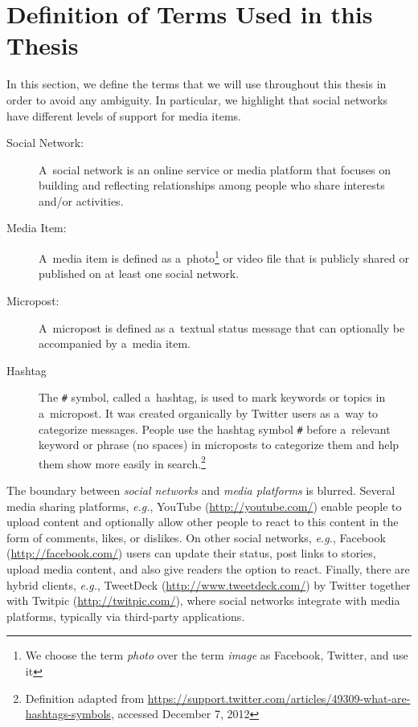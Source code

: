 \section{Definition of Terms Used in this Thesis}
\label{sec:definition}

In this section, we define the terms
that we will use throughout this thesis
in order to avoid any ambiguity.
In particular, we highlight that social networks have
different levels of support for media items.

\begin{description}
  \item[Social Network:]
       A~social network is an online service or media platform
       that focuses on building and reflecting
       relationships among people
       who share interests and/or activities.
  \item[Media Item:]
       A~media item is defined as
       a~photo\footnote{We choose the term \emph{photo}
       over the term \emph{image} as 
       Facebook, Twitter, and \googleplus use it}
       or video file that is publicly shared or published
       on at least one social network.
  \item[Micropost:]
       A~micropost is defined as a~textual status message
       that can optionally be accompanied by a~media item.
  \item[Hashtag] The \texttt{\#} symbol, called a~hashtag,
       is used to mark keywords or topics in a~micropost.
       It was created organically by Twitter users
       as a~way to categorize messages.
       People use the hashtag symbol \texttt{\#} before a~relevant keyword
       or phrase (no spaces) in microposts to categorize them
       and help them show more easily in
       search.\footnote{Definition adapted from
       \url{https://support.twitter.com/articles/49309-what-are-hashtags-symbols},
       accessed December 7, 2012}
\end{description}

The boundary between \emph{social networks} and
\emph{media platforms} is blurred.
Several media sharing platforms, \emph{e.g.},
YouTube (\url{http://youtube.com/})
enable people to upload content
and optionally allow other people to react
to this content in the form of comments, likes, or dislikes.
On other social networks, \emph{e.g.},
Facebook (\url{http://facebook.com/})
users can update their status, post links to stories,
upload media content, and also give readers the option to react.
Finally, there are hybrid clients, \emph{e.g.},
TweetDeck (\url{http://www.tweetdeck.com/})
by Twitter together with
Twitpic (\url{http://twitpic.com/}),
where social networks integrate with media platforms,
typically via third-party applications.

